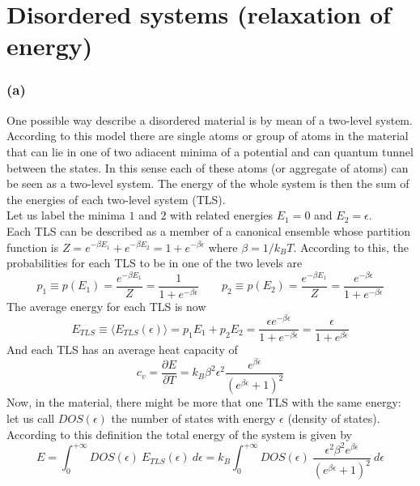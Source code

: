 \documentclass{article}
\begin{document}
\newpage

\section*{Disordered systems (relaxation of energy)}

\subsubsection*{(a)}
One possible way describe a disordered material is by mean of a two-level system. According to this model there are single atoms or group of atoms in the material that can lie in one of two adiacent minima of 
a potential and can quantum tunnel between the states. In this sense each of these atoms (or aggregate of atoms) can be seen as a two-level system. The energy of the whole system is then the sum of the energies of each two-level system (TLS). \\
Let us label the minima $1$ and $2$ with related energies $E_1=0$ and $E_2=\epsilon$. \\
Each TLS can be described as a member of a canonical ensemble whose partition function is $Z = e^{-\beta E_1} + e^{-\beta E_2} = 1 + e^{-\beta \epsilon}$ where $\beta = 1/k_BT$. According to this, the probabilities for each TLS to be in one of the two levels are
\begin{equation*}
    p_1 \equiv p(E_1) = \frac{e^{-\beta E_1}}{Z} = \frac{1}{1 + e^{-\beta \epsilon}} \qquad p_2 \equiv p(E_2) = \frac{e^{-\beta E_1}}{Z} = \frac{e^{-\beta \epsilon}}{1 + e^{-\beta \epsilon}}
\end{equation*}
The average energy for each TLS is now
\begin{equation*}
    E_{TLS} \equiv \langle E_{TLS}(\epsilon) \rangle = p_1 E_1 + p_2 E_2 = \frac{\epsilon e^{-\beta\epsilon}}{1 + e^{-\beta\epsilon}} = \frac{\epsilon}{1 + e^{\beta\epsilon}}
\end{equation*}
And each TLS has an average heat capacity of
\begin{equation*}
    c_v = \frac{\partial E}{\partial T} = k_B \beta^2 \epsilon^2 \frac{e^{\beta \epsilon}}{(e^{\beta \epsilon} + 1)^2}
\end{equation*}
Now, in the material, there might be more that one TLS with the same energy: let us call $DOS(\epsilon)$  the number of states with energy $\epsilon$ (density of states). According to this definition the total energy of the system is given by 
\begin{equation*}
    E = \int_0^{+\infty} DOS(\epsilon) \ E_{TLS}(\epsilon) \ d\epsilon = k_B \int_0^{+\infty} DOS(\epsilon) \ \frac{\epsilon^2\beta^2 e^{\beta\epsilon}}{(e^{\beta \epsilon}+1)^2} \ d\epsilon
\end{equation*}
\end{document}
